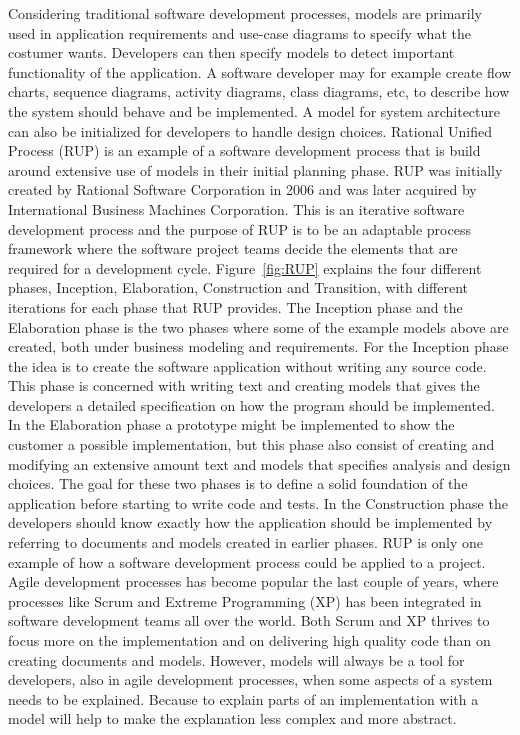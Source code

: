 Considering traditional software development processes, models are
primarily used in application requirements and use-case diagrams to specify what 
the costumer wants. Developers can then specify models to detect important
functionality of the application. A software developer may for example create
flow charts, sequence diagrams, activity diagrams, class diagrams, etc, to
describe how the system should behave and be implemented. A model for system
architecture can also be initialized for developers to handle design choices. Rational
Unified Process\cite{Rational1998} (RUP) is an example of a software
development process that is build around extensive use of models in their
initial planning phase. RUP was initially created by Rational Software
Corporation\cite{IBMRational} in 2006 and was later acquired by International
Business Machines Corporation\cite{IBM}. This is an iterative software
development process and the purpose of RUP is to be an adaptable process
framework where the software project teams decide the elements that are
required for a development cycle. Figure~\ref{fig:RUP} explains the four
different phases, Inception, Elaboration, Construction and Transition, with
different iterations for each phase that RUP provides. The Inception phase and
the Elaboration phase is the two phases where some of the example models above
are created, both under business modeling and requirements. For the Inception
phase the idea is to create the software application without writing
any source code. This phase is  concerned with writing text and creating models
that gives the developers a detailed specification on how the program should be
implemented. In the Elaboration phase a prototype might be implemented to show
the customer a possible implementation, but this phase also consist of creating
and modifying an extensive amount text and models that specifies analysis and
design choices. The goal for these two phases is to define a solid foundation of
the application before starting to write code and tests.
In the Construction phase the developers should know exactly how the application
should be implemented by referring to documents and models created in earlier
phases. RUP is only one example of how a software development process could be
applied to a project. Agile development processes has become popular the last
couple of years, where processes like Scrum\cite{Schwaber2001} and Extreme
Programming\cite{Beck1999} (XP) has been integrated in software development
teams all over the world. Both Scrum and XP thrives to focus more on the
implementation and on delivering high quality code than on creating documents
and models. However, models will always be a tool for developers, also in agile
development processes, when some aspects of a system needs to be explained.
Because to explain parts of an implementation with a model will help to make
the explanation less complex and more abstract.

